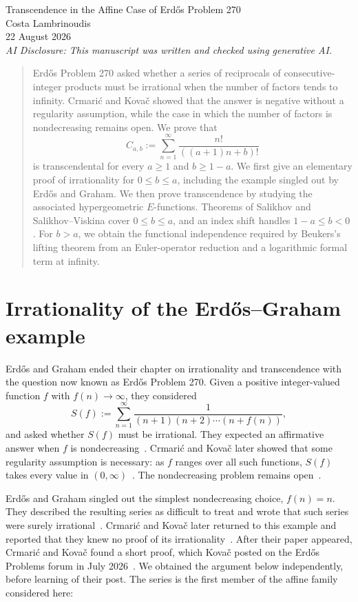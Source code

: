 \documentclass[12pt]{article}
\begin{document}
\begin{center}
{\LARGE Transcendence in the Affine Case of Erd\H{o}s Problem 270}\\[1.5ex]
{\large Costa Lambrinoudis}\\[0.5ex]
{22 August 2026}\\[1.75ex]
{\small\itshape AI Disclosure: This manuscript was written and checked using generative AI.}
\end{center}

\begin{quote}
\small
Erd\H{o}s Problem 270 asked whether a series of reciprocals of consecutive-integer products must be irrational when the number of factors tends to infinity. Crmari\'c and Kova\v{c} showed that the answer is negative without a regularity assumption, while the case in which the number of factors is nondecreasing remains open. We prove that
\[
C_{a,b}:=\sum_{n=1}^{\infty}\frac{n!}{((a+1)n+b)!}
\]
is transcendental for every $a\geq1$ and $b\geq1-a$. We first give an elementary proof of irrationality for $0\leq b\leq a$, including the example singled out by Erd\H{o}s and Graham. We then prove transcendence by studying the associated hypergeometric $E$-functions. Theorems of Salikhov and Salikhov--Viskina cover $0\leq b\leq a$, and an index shift handles $1-a\leq b<0$. For $b>a$, we obtain the functional independence required by Beukers's lifting theorem from an Euler-operator reduction and a logarithmic formal term at infinity.
\end{quote}

\section{Irrationality of the Erd\H{o}s--Graham example}
\label{sec:elementary-proof}

Erd\H{o}s and Graham ended their chapter on irrationality and transcendence with the question now known as Erd\H{o}s Problem 270. Given a positive integer-valued function $f$ with $f(n)\to\infty$, they considered
\[
S(f):=\sum_{n=1}^{\infty}
\frac1{(n+1)(n+2)\cdots(n+f(n))},
\]
and asked whether $S(f)$ must be irrational. They expected an affirmative answer when $f$ is nondecreasing~\cite[p.~66]{erdos-graham}. Crmari\'c and Kova\v{c} later showed that some regularity assumption is necessary: as $f$ ranges over all such functions, $S(f)$ takes every value in $(0,\infty)$~\cite[Theorem~1]{crmaric-kovac}. The nondecreasing problem remains open~\cite{bloom-270}.

Erd\H{o}s and Graham singled out the simplest nondecreasing choice, $f(n)=n$. They described the resulting series as difficult to treat and wrote that such series were surely irrational~\cite[pp.~65--66]{erdos-graham}. Crmari\'c and Kova\v{c} later returned to this example and reported that they knew no proof of its irrationality~\cite[p.~55, following (1.1)]{crmaric-kovac}. After their paper appeared, Crmari\'c and Kova\v{c} found a short proof, which Kova\v{c} posted on the Erd\H{o}s Problems forum in July 2026~\cite{kovac-forum}. We obtained the argument below independently, before learning of their post. The series is the first member of the affine family considered here:
\end{document}
